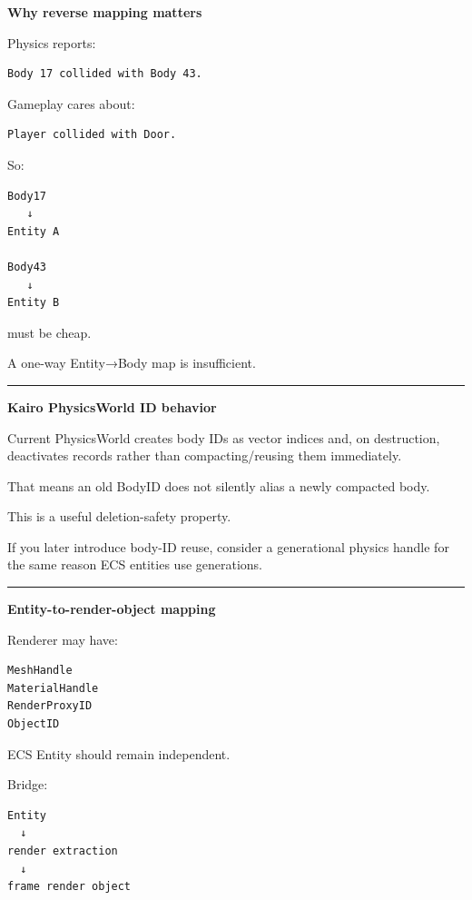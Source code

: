 \textbf{Why reverse mapping matters}

Physics reports:

\begin{verbatim}
Body 17 collided with Body 43.
\end{verbatim}

Gameplay cares about:

\begin{verbatim}
Player collided with Door.
\end{verbatim}

So:

\begin{verbatim}
Body17
   ↓
Entity A

Body43
   ↓
Entity B
\end{verbatim}

must be cheap.

A one-way Entity→Body map is insufficient.

\begin{center}\rule{0.5\linewidth}{0.5pt}\end{center}

\textbf{Kairo PhysicsWorld ID behavior}

Current PhysicsWorld creates body IDs as vector indices and, on destruction, deactivates records rather than compacting/reusing them immediately.

That means an old BodyID does not silently alias a newly compacted body.

This is a useful deletion-safety property.

If you later introduce body-ID reuse, consider a generational physics handle for the same reason ECS entities use generations.

\begin{center}\rule{0.5\linewidth}{0.5pt}\end{center}

\textbf{Entity-to-render-object mapping}

Renderer may have:

\begin{verbatim}
MeshHandle
MaterialHandle
RenderProxyID
ObjectID
\end{verbatim}

ECS Entity should remain independent.

Bridge:

\begin{verbatim}
Entity
  ↓
render extraction
  ↓
frame render object
\end{verbatim}

